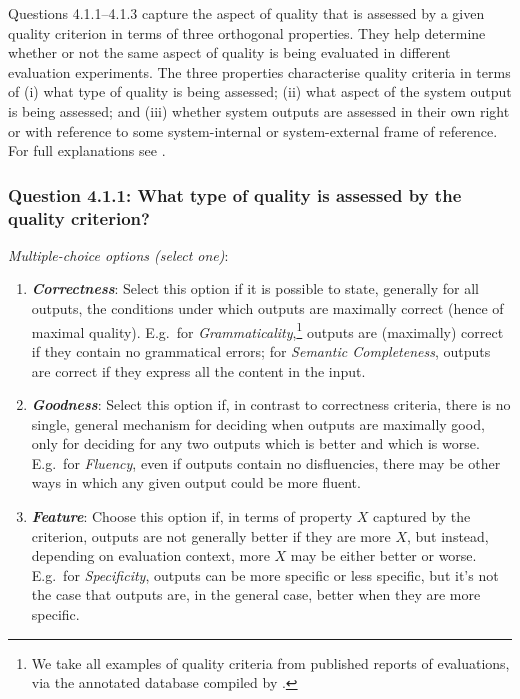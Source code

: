 \documentclass[11pt,a4paper]{article}
\newcommand{\egcvalue}[1]{\textbf{\textit{#1}}}
\begin{document}
Questions 4.1.1--4.1.3 capture the aspect of quality that is assessed by a given quality criterion in terms of three orthogonal properties. They help determine whether or not the same aspect of quality is being evaluated in different evaluation experiments. The three properties characterise quality criteria in terms of (i) what type of quality is being assessed; (ii) what aspect of the system output is being assessed; and (iii) whether system outputs are assessed in their own right or with reference to some system-internal or system-external frame of reference. For full explanations see \citet{belz-etal-2020-disentangling}.

\vspace{-.3cm}
\subsubsection*{Question 4.1.1:  What type of quality is assessed by the quality criterion?}
\vspace{-.1cm}

\vspace{.3cm}
\noindent\textit{Multiple-choice options (select one)}:  
\vspace{-.1cm}

\begin{enumerate}[itemsep=0cm,leftmargin=0.5cm,label={\LARGE $\circ$}]
    \item \egcvalue{Correctness}: Select this option if it is possible to state,  generally for all outputs,  the conditions under which outputs are maximally correct (hence of maximal quality).  E.g.\ for \textit{Grammaticality},\footnote{We take all examples of quality criteria from published reports of evaluations, via the annotated database compiled by \citet{howcroft-etal-2020-twenty}.} outputs are (maximally) correct if they contain no grammatical errors; for \textit{Semantic Completeness}, outputs are correct if they express all the content in the input.
    \item \egcvalue{Goodness}: Select this option if, in contrast to correctness criteria, there is no single, general mechanism for deciding when outputs are maximally good, only for deciding for any two outputs which is better and which is worse. E.g.\ for \textit{Fluency}, even if outputs contain no disfluencies, there may be other ways in which any given output could be more fluent.
    \item \egcvalue{Feature}: Choose this option if, in terms of property $X$ captured by the criterion, outputs are not generally better if they are more $X$, but instead, depending on evaluation context, more $X$ may be either better or worse. E.g.\ for \textit{Specificity}, outputs can be more specific or less specific, but it’s not the case that outputs are, in the general case, better when they are more specific.
\end{enumerate}
\end{document}
